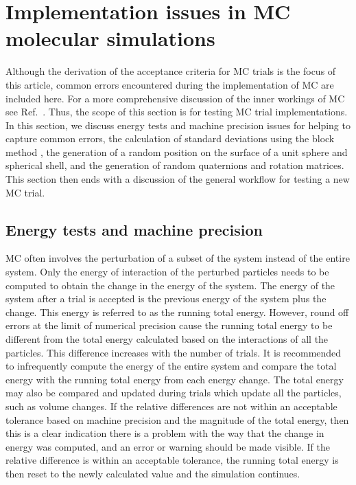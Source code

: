 \documentclass[
  9pt,
  bestpractices,
]{livecoms}
\begin{document}
\section{\label{sec:common_issues}Implementation issues in MC molecular simulations}

Although the derivation of the acceptance criteria for MC trials is the focus of this article, common errors encountered during the implementation of MC are included here.
For a more comprehensive discussion of the inner workings of MC see Ref.~\cite{dubbeldam_inner_2013}.
Thus, the scope of this section is for testing MC trial implementations.
In this section, we discuss energy tests and machine precision issues for helping to capture common errors, the calculation of standard deviations using the block method \cite{flyvbjerg_error_1989, grossfield_best_2018}, the generation of a random position on the surface of a unit sphere and spherical shell, and the generation of random quaternions and rotation matrices.
This section then ends with a discussion of the general workflow for testing a new MC trial.

\subsection{\label{sec:energy_test}Energy tests and machine precision}

MC often involves the perturbation of a subset of the system instead of the entire system.
Only the energy of interaction of the perturbed particles needs to be computed to obtain the change in the energy of the system.
The energy of the system after a trial is accepted is the previous energy of the system plus the change.
This energy is referred to as the running total energy.
However, round off errors at the limit of numerical precision cause the running total energy to be different from the total energy calculated based on the interactions of all the particles.
This difference increases with the number of trials.
It is recommended to infrequently compute the energy of the entire system and compare the total energy with the running total energy from each energy change.
The total energy may also be compared and updated during trials which update all the particles, such as volume changes.
If the relative differences are not within an acceptable tolerance based on machine precision and the magnitude of the total energy, then this is a clear indication there is a problem with the way that the change in energy was computed, and an error or warning should be made visible.
If the relative difference is within an acceptable tolerance, the running total energy is then reset to the newly calculated value and the simulation continues.
\end{document}

